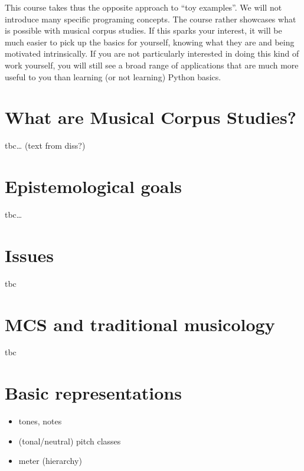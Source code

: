 \documentclass[letterpaper,10pt,english]{sphinxmanual}
\begin{document}
This course takes thus the opposite approach to “toy examples”. We will not introduce many specific
programing concepts. The course rather showcases what is possible with musical corpus studies.
If this sparks your interest, it will be much easier to pick up the basics for yourself,
knowing what they are  and being motivated intrinsically.
If you are not particularly interested in doing this kind of work yourself,
you will still see a broad range of applications that are much more useful to you than
learning (or not learning) Python basics.


\section{What are Musical Corpus Studies?}
\label{\detokenize{2_introduction:what-are-musical-corpus-studies}}
tbc… (text from diss?)


\section{Epistemological goals}
\label{\detokenize{2_introduction:epistemological-goals}}
tbc…


\section{Issues}
\label{\detokenize{2_introduction:issues}}
tbc 


\section{MCS and traditional musicology}
\label{\detokenize{2_introduction:mcs-and-traditional-musicology}}
tbc


\section{Basic representations}
\label{\detokenize{2_introduction:basic-representations}}\begin{itemize}
\item {} 
tones, notes

\item {} 
(tonal/neutral) pitch classes

\item {} 
meter (hierarchy)

\end{itemize}
\end{document}
